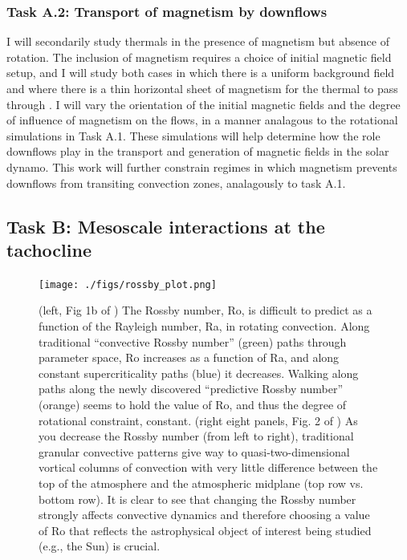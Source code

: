 \documentclass[aasms,11pt]{article}
\begin{document}
\subsubsection{Task A.2: Transport of magnetism by downflows}
\label{sct:taskA2}
I will secondarily study thermals in the presence of magnetism but absence of rotation.
The inclusion of magnetism requires a choice of initial magnetic field setup, and I will study both cases in which there is a uniform background field and where there is a thin horizontal sheet of magnetism for the thermal to pass through \citep[as in][]{tobias&all1998}.
I will vary the orientation of the initial magnetic fields and the degree of influence of magnetism on the flows, in a manner analagous to the rotational simulations in Task A.1.
These simulations will help determine how the role downflows play in the transport and generation of magnetic fields in the solar dynamo.
This work will further constrain regimes in which magnetism prevents downflows from transiting convection zones, analagously to task A.1. 

\subsection{Task B: Mesoscale interactions at the tachocline}
\label{sct:taskB}
\begin{figure}[t!]
    \texttt{[image: ./figs/rossby\_plot.png]}
    \caption{(left, Fig 1b of \citet{anders&all2019}) The Rossby number, Ro, is difficult to predict as a function of the Rayleigh number, Ra, in rotating convection.
	Along traditional ``convective Rossby number'' (green) paths through parameter space, Ro increases as a function of Ra, and along constant supercriticality paths (blue) it decreases.
	Walking along paths along the newly discovered ``predictive Rossby number'' (orange) seems to hold the value of Ro, and thus the degree of rotational constraint, constant.
	(right eight panels, Fig. 2 of \citet{anders&all2019}) As you decrease the Rossby number (from left to right), traditional granular convective patterns give way to quasi-two-dimensional vortical columns of convection with very little difference between the top of the atmosphere and the atmospheric midplane (top row vs. bottom row).
	It is clear to see that changing the Rossby number strongly affects convective dynamics and therefore choosing a value of Ro that reflects the astrophysical object of interest being studied (e.g., the Sun) is crucial.
	\label{fig:rossby_plot} }
\end{figure}
\end{document}

